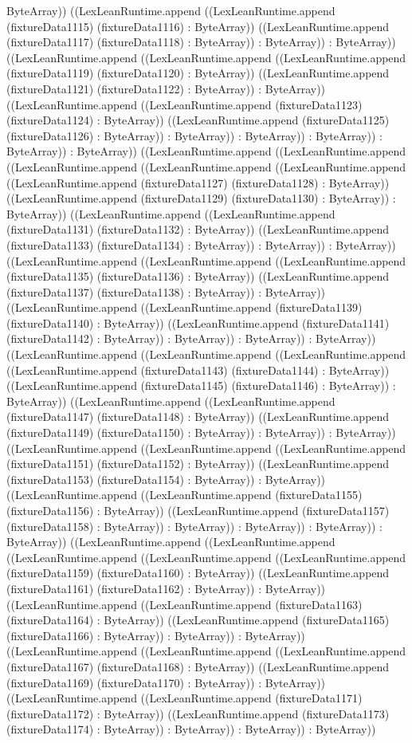 \documentclass[11pt]{article}
\begin{document}
ByteArray)) ((LexLeanRuntime.append ((LexLeanRuntime.append (fixtureData1115) (fixtureData1116) : ByteArray)) ((LexLeanRuntime.append (fixtureData1117) (fixtureData1118) : ByteArray)) : ByteArray)) : ByteArray)) ((LexLeanRuntime.append ((LexLeanRuntime.append ((LexLeanRuntime.append (fixtureData1119) (fixtureData1120) : ByteArray)) ((LexLeanRuntime.append (fixtureData1121) (fixtureData1122) : ByteArray)) : ByteArray)) ((LexLeanRuntime.append ((LexLeanRuntime.append (fixtureData1123) (fixtureData1124) : ByteArray)) ((LexLeanRuntime.append (fixtureData1125) (fixtureData1126) : ByteArray)) : ByteArray)) : ByteArray)) : ByteArray)) : ByteArray)) : ByteArray)) ((LexLeanRuntime.append ((LexLeanRuntime.append ((LexLeanRuntime.append ((LexLeanRuntime.append ((LexLeanRuntime.append ((LexLeanRuntime.append (fixtureData1127) (fixtureData1128) : ByteArray)) ((LexLeanRuntime.append (fixtureData1129) (fixtureData1130) : ByteArray)) : ByteArray)) ((LexLeanRuntime.append ((LexLeanRuntime.append (fixtureData1131) (fixtureData1132) : ByteArray)) ((LexLeanRuntime.append (fixtureData1133) (fixtureData1134) : ByteArray)) : ByteArray)) : ByteArray)) ((LexLeanRuntime.append ((LexLeanRuntime.append ((LexLeanRuntime.append (fixtureData1135) (fixtureData1136) : ByteArray)) ((LexLeanRuntime.append (fixtureData1137) (fixtureData1138) : ByteArray)) : ByteArray)) ((LexLeanRuntime.append ((LexLeanRuntime.append (fixtureData1139) (fixtureData1140) : ByteArray)) ((LexLeanRuntime.append (fixtureData1141) (fixtureData1142) : ByteArray)) : ByteArray)) : ByteArray)) : ByteArray)) ((LexLeanRuntime.append ((LexLeanRuntime.append ((LexLeanRuntime.append ((LexLeanRuntime.append (fixtureData1143) (fixtureData1144) : ByteArray)) ((LexLeanRuntime.append (fixtureData1145) (fixtureData1146) : ByteArray)) : ByteArray)) ((LexLeanRuntime.append ((LexLeanRuntime.append (fixtureData1147) (fixtureData1148) : ByteArray)) ((LexLeanRuntime.append (fixtureData1149) (fixtureData1150) : ByteArray)) : ByteArray)) : ByteArray)) ((LexLeanRuntime.append ((LexLeanRuntime.append ((LexLeanRuntime.append (fixtureData1151) (fixtureData1152) : ByteArray)) ((LexLeanRuntime.append (fixtureData1153) (fixtureData1154) : ByteArray)) : ByteArray)) ((LexLeanRuntime.append ((LexLeanRuntime.append (fixtureData1155) (fixtureData1156) : ByteArray)) ((LexLeanRuntime.append (fixtureData1157) (fixtureData1158) : ByteArray)) : ByteArray)) : ByteArray)) : ByteArray)) : ByteArray)) ((LexLeanRuntime.append ((LexLeanRuntime.append ((LexLeanRuntime.append ((LexLeanRuntime.append ((LexLeanRuntime.append (fixtureData1159) (fixtureData1160) : ByteArray)) ((LexLeanRuntime.append (fixtureData1161) (fixtureData1162) : ByteArray)) : ByteArray)) ((LexLeanRuntime.append ((LexLeanRuntime.append (fixtureData1163) (fixtureData1164) : ByteArray)) ((LexLeanRuntime.append (fixtureData1165) (fixtureData1166) : ByteArray)) : ByteArray)) : ByteArray)) ((LexLeanRuntime.append ((LexLeanRuntime.append ((LexLeanRuntime.append (fixtureData1167) (fixtureData1168) : ByteArray)) ((LexLeanRuntime.append (fixtureData1169) (fixtureData1170) : ByteArray)) : ByteArray)) ((LexLeanRuntime.append ((LexLeanRuntime.append (fixtureData1171) (fixtureData1172) : ByteArray)) ((LexLeanRuntime.append (fixtureData1173) (fixtureData1174) : ByteArray)) : ByteArray)) : ByteArray)) : ByteArray)) 
\end{document}
